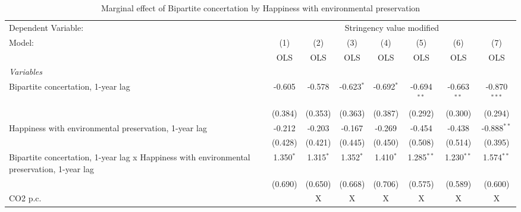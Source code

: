 
\begin{table}[htbp]
   \caption{Marginal effect of Bipartite concertation by Happiness with environmental preservation}
   \centering
   \begin{tabular}{lccccccc}
      \toprule
      Dependent Variable: & \multicolumn{7}{c}{Stringency value modified}\\
      Model:                                                                                     & (1)         & (2)         & (3)          & (4)          & (5)           & (6)           & (7)\\  
                                                                                                 &  OLS        & OLS         & OLS          & OLS          & OLS           & OLS           & OLS\\  
      \midrule
      \emph{Variables}\\
      Bipartite concertation, 1-year lag                                                         & -0.605      & -0.578      & -0.623$^{*}$ & -0.692$^{*}$ & -0.694$^{**}$ & -0.663$^{**}$ & -0.870$^{***}$\\   
                                                                                                 & (0.384)     & (0.353)     & (0.363)      & (0.387)      & (0.292)       & (0.300)       & (0.294)\\   
      Happiness with environmental preservation, 1-year lag                                      & -0.212      & -0.203      & -0.167       & -0.269       & -0.454        & -0.438        & -0.888$^{**}$\\   
                                                                                                 & (0.428)     & (0.421)     & (0.445)      & (0.450)      & (0.508)       & (0.514)       & (0.395)\\   
      Bipartite concertation, 1-year lag x Happiness with environmental preservation, 1-year lag & 1.350$^{*}$ & 1.315$^{*}$ & 1.352$^{*}$  & 1.410$^{*}$  & 1.285$^{**}$  & 1.230$^{**}$  & 1.574$^{**}$\\   
                                                                                                 & (0.690)     & (0.650)     & (0.668)      & (0.706)      & (0.575)       & (0.589)       & (0.600)\\   
      CO2 p.c.                                                                                   &             & X           & X            & X            & X             & X             & X\\  

\end{tabular}
\end{table}
